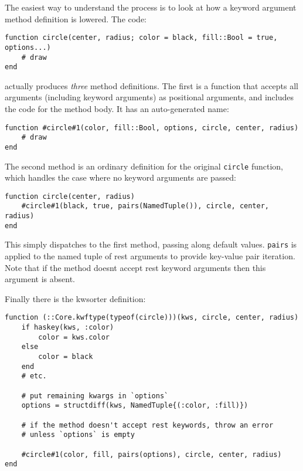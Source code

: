 The easiest way to understand the process is to look at how a keyword argument method definition is lowered. The code:




\begin{verbatim}
function circle(center, radius; color = black, fill::Bool = true, options...)
    # draw
end
\end{verbatim}



actually produces \emph{three} method definitions. The first is a function that accepts all arguments (including keyword arguments) as positional arguments, and includes the code for the method body. It has an auto-generated name:




\begin{verbatim}
function #circle#1(color, fill::Bool, options, circle, center, radius)
    # draw
end
\end{verbatim}



The second method is an ordinary definition for the original \texttt{circle} function, which handles the case where no keyword arguments are passed:




\begin{verbatim}
function circle(center, radius)
    #circle#1(black, true, pairs(NamedTuple()), circle, center, radius)
end
\end{verbatim}



This simply dispatches to the first method, passing along default values. \texttt{pairs} is applied to the named tuple of rest arguments to provide key-value pair iteration. Note that if the method doesn{\textquotesingle}t accept rest keyword arguments then this argument is absent.



Finally there is the kwsorter definition:




\begin{lstlisting}
function (::Core.kwftype(typeof(circle)))(kws, circle, center, radius)
    if haskey(kws, :color)
        color = kws.color
    else
        color = black
    end
    # etc.

    # put remaining kwargs in `options`
    options = structdiff(kws, NamedTuple{(:color, :fill)})

    # if the method doesn't accept rest keywords, throw an error
    # unless `options` is empty

    #circle#1(color, fill, pairs(options), circle, center, radius)
end
\end{lstlisting}



